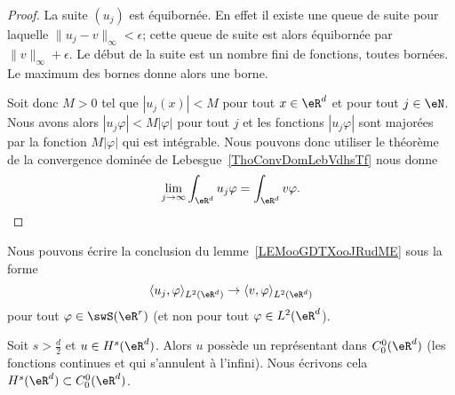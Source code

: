 \begin{proof}
    La suite \( (u_j)\) est équibornée. En effet il existe une queue de suite pour laquelle \( \| u_j-v \|_{\infty}<\epsilon\); cette queue de suite est alors équibornée par \( \| v \|_{\infty}+\epsilon\). Le début de la suite est un nombre fini de fonctions, toutes bornées. Le maximum des bornes donne alors une borne.

    Soit donc \( M>0\) tel que \( | u_j(x) |<M\) pour tout \( x\in \eR^d\) et pour tout \( j\in \eN\). Nous avons alors \( | u_j\varphi |<M| \varphi |\) pour tout \( j\) et les fonctions \(  | u_j\varphi | \) sont majorées par la fonction \( M| \varphi |\) qui est intégrable. Nous pouvons donc utiliser le théorème de la convergence dominée de Lebesgue~\ref{ThoConvDomLebVdhsTf} nous donne
    \begin{equation}
        \lim_{j\to \infty} \int_{\eR^d} u_j\varphi=\int_{\eR^d}v\varphi.
    \end{equation}
\end{proof}

Nous pouvons écrire la conclusion du lemme~\ref{LEMooGDTXooJRudME} sous la forme
\begin{equation}
    \langle u_j, \varphi\rangle_{L^2(\eR^d)}\to \langle v, \varphi\rangle_{L^2(\eR^d)}
\end{equation}
pour tout \( \varphi\in \swS(\eR^r)\) (et non pour tout \( \varphi\in L^2(\eR^d\)).

\begin{theorem}[Théorème de Sobolev avec \( k=0\)\cite{ooFZERooPVhoge}]     \label{THOooOHIPooXSEkVI}
    Soit \( s>\frac{ d }{ 2 }\) et \( u\in H^s(\eR^d)\). Alors \( u\) possède un représentant dans \( C^0_0(\eR^d)\) (les fonctions continues et qui s'annulent à l'infini). Nous écrivons cela \( H^s(\eR^d)\subset C_0^0(\eR^d)\).
\end{theorem}

